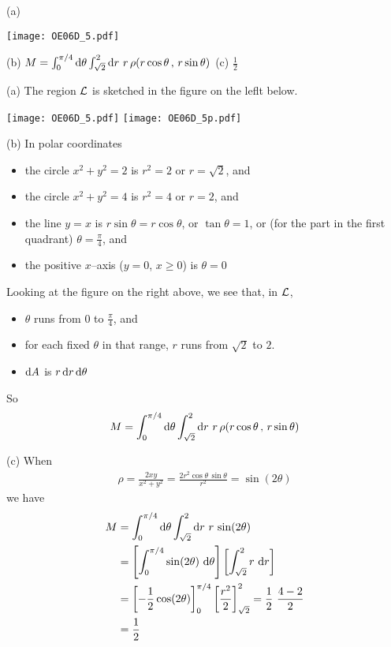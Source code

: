 %

\begin{answer}
(a)

\begin{center}
     \texttt{[image: OE06D\_5.pdf]}
\end{center}

(b) $M = \int_0^{\pi/4}\mathrm{d}\theta\int_{\sqrt{2}}^2\mathrm{d}r\ r\,
         \rho(r\cos\theta\,,\,r\sin\theta)$ \qquad
(c) $\frac{1}{2}$
\end{answer}

\begin{solution}
(a) The region $\mathcal{L}$ is sketched in the figure on the leflt below.
\begin{center}
     \texttt{[image: OE06D\_5.pdf]}\qquad
     \texttt{[image: OE06D\_5p.pdf]}
\end{center}

(b) In polar coordinates
\begin{itemize}
\item
the circle $x^2+y^2=2$ is $r^2=2$ or $r=\sqrt{2}$, and
\item
the circle $x^2+y^2=4$ is $r^2=4$ or $r=2$, and
\item
the line $y=x$ is $r\sin\theta = r\cos\theta$, or $\tan\theta =1 $,
or (for the part in the first quadrant) $\theta=\frac{\pi}{4}$, and
\item 
the positive $x$--axis ($y=0$, $x\ge 0$) is $\theta=0$ 
\end{itemize}
Looking at the figure on the right above, we see that, in $\mathcal{L}$,
\begin{itemize}
\item 
$\theta$ runs from $0$ to $\frac{\pi}{4}$, and
\item
for each fixed $\theta$ in that range, $r$ runs from $\sqrt{2}$
to $2$.
\item
$\mathrm{d}A$ is $r\,\mathrm{d}r\,\mathrm{d}\theta$
\end{itemize}
So
\begin{align*}
M = \int_0^{\pi/4}\mathrm{d}\theta\int_{\sqrt{2}}^2\mathrm{d}r\ r\,
         \rho(r\cos\theta\,,\,r\sin\theta)
\end{align*}

(c) When
\begin{align*}
\rho = \frac{2xy}{x^2+y^2} = \frac{2r^2\cos\theta\,\sin\theta}{r^2}
     =\sin(2\theta)
\end{align*}
we have
\begin{align*}
M &= \int_0^{\pi/4}\mathrm{d}\theta\int_{\sqrt{2}}^2\mathrm{d}r\ r\,
          \sin(2\theta) \\
&=\left[\int_0^{\pi/4}\sin(2\theta)\ \mathrm{d}\theta\right]
 \left[\int_{\sqrt{2}}^2 r\ \mathrm{d}r\right] \\
&=\left[-\frac{1}{2}\cos(2\theta)\right]_0^{\pi/4}
 \left[ \frac{r^2}{2}\right]_{\sqrt{2}}^2 
  =\frac{1}{2}\ \frac{4-2}{2} \\
&=\frac{1}{2}
\end{align*}
\end{solution}

